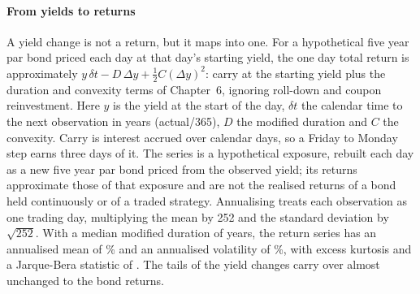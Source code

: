 \begin{chapterrefs}
\paragraph{From yields to returns}
A yield change is not a return, but it maps into one. For a hypothetical five year par bond priced each day at that day's starting yield, the one day
total return is approximately
$y\,\delta t - D\,\Delta y + \tfrac12 C(\Delta y)^2$: carry at the starting yield plus the duration
and convexity terms of Chapter~6, ignoring roll-down and coupon reinvestment. Here $y$ is the yield at
the start of the day, $\delta t$ the calendar time to the next observation in years (actual/365), $D$
the modified duration and $C$ the convexity. Carry is interest accrued over calendar days, so a Friday to Monday step earns three days
of it. The series is a hypothetical exposure, rebuilt each day as a new five year par bond priced from
the observed yield; its returns approximate those of that exposure and are not the realised returns
of a bond held continuously or of a traded strategy. Annualising
treats each observation as one trading day, multiplying the mean by 252 and the standard deviation by
$\sqrt{252}$. With a median modified duration of \gocDur{} years, the return series has an annualised mean of \gocRmean\% and an annualised volatility of
\gocRsd\%, with excess kurtosis \gocRexk{} and a Jarque-Bera statistic of \gocRJB. The tails of the
yield changes carry over almost unchanged to the bond returns.


\end{chapterrefs}
